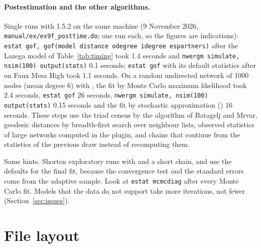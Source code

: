 \paragraph{Postestimation and the other algorithms.} Single runs with 1.5.2 on the same machine (9 November 2026, \texttt{manual/ex/ex9f\_posttime.do}; one run each, so the figures are indications): \texttt{estat gof, gof(model distance odegree idegree espartners)} after the Lazega model of Table~\ref{tab:timing} took 1.4 seconds and \texttt{nwergm simulate, nsim(100) output(stats)} 0.1 seconds; \texttt{estat gof} with its default statistics after  on Faux Mesa High took 1.1 seconds. On a random undirected network of 1000 nodes (mean degree 6) with , the fit by Monte Carlo maximum likelihood took 2.4 seconds, \texttt{estat gof} 26 seconds, \texttt{nwergm simulate, nsim(100) output(stats)} 0.15 seconds and the fit by stochastic approximation () 16 seconds. These steps use the triad census by the algorithm of Batagelj and Mrvar, geodesic distances by breadth-first search over neighbour lists, observed statistics of large networks computed in the plugin, and chains that continue from the statistics of the previous draw instead of recomputing them.

Some hints. Shorten exploratory runs with  and a short chain, and use the defaults for the final fit, because the convergence test and the standard errors come from the adaptive sample. Look at \texttt{estat mcmcdiag} after every Monte Carlo fit. Models that the data do not support take more iterations, not fewer (Section~\ref{sec:issues}).

\section{File layout}

